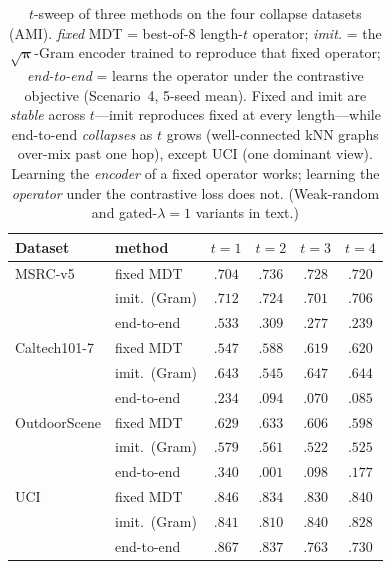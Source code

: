 \documentclass[10pt,twocolumn]{article}
\newcommand{\bp}{\boldsymbol{\pi}}
\begin{document}
\begin{table}[t]\centering\footnotesize
\caption{$t$-sweep of three methods on the four collapse datasets (AMI). \emph{fixed} MDT = best-of-8
length-$t$ operator; \emph{imit.} = the $\sqrt{\bp}$-Gram encoder trained to reproduce that fixed operator;
\emph{end-to-end} = learns the operator under the contrastive objective (Scenario~4, 5-seed mean). Fixed
and imit are \emph{stable} across $t$---imit reproduces fixed at every length---while end-to-end
\emph{collapses} as $t$ grows (well-connected kNN graphs over-mix past one hop), except UCI (one dominant
view). Learning the \emph{encoder} of a fixed operator works; learning the \emph{operator} under the
contrastive loss does not. (Weak-random and gated-$\lambda{=}1$ variants in text.)}
\label{tab:collapse-fair}
\setlength{\tabcolsep}{6pt}
\begin{tabular}{@{}ll cccc@{}}
\toprule
Dataset & method & $t{=}1$ & $t{=}2$ & $t{=}3$ & $t{=}4$\\
\midrule
MSRC-v5      & fixed MDT      & $.704$ & $.736$ & $.728$ & $.720$\\
             & imit.\ (Gram)  & $.712$ & $.724$ & $.701$ & $.706$\\
             & end-to-end     & $.533$ & $.309$ & $.277$ & $.239$\\
\midrule
Caltech101-7 & fixed MDT      & $.547$ & $.588$ & $.619$ & $.620$\\
             & imit.\ (Gram)  & $.643$ & $.545$ & $.647$ & $.644$\\
             & end-to-end     & $.234$ & $.094$ & $.070$ & $.085$\\
\midrule
OutdoorScene & fixed MDT      & $.629$ & $.633$ & $.606$ & $.598$\\
             & imit.\ (Gram)  & $.579$ & $.561$ & $.522$ & $.525$\\
             & end-to-end     & $.340$ & $.001$ & $.098$ & $.177$\\
\midrule
UCI          & fixed MDT      & $.846$ & $.834$ & $.830$ & $.840$\\
             & imit.\ (Gram)  & $.841$ & $.810$ & $.840$ & $.828$\\
             & end-to-end     & $.867$ & $.837$ & $.763$ & $.730$\\
\bottomrule
\end{tabular}
\end{table}
\end{document}
